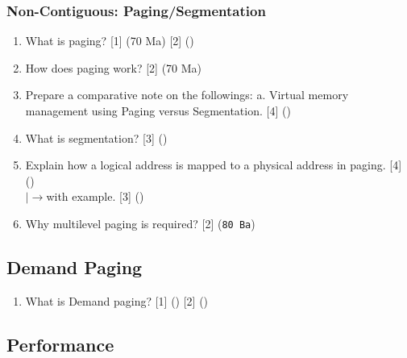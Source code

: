 \documentclass[12pt]{article}
\newcommand{\lb}{\\$\left|\rightarrow\right.$}
\begin{document}
		\subsubsection{Non-Contiguous: Paging/Segmentation}
			\begin{enumerate}[noitemsep, topsep=0pt]
				\item What is paging? \hfill [1] (70 Ma) [2] ()

				\item How does paging work? \hfill [2] (70 Ma)

				\item Prepare a comparative note on the followings: a. Virtual memory management using Paging versus Segmentation. \hfill [4] ()

				\item What is segmentation? \hfill [3] ()
				
				\item Explain how a logical address is mapped to a physical address in paging. \hfill [4] ()
				\lb with example. \hfill [3] ()

				\item Why multilevel paging is required? \hfill [2] (\texttt{80 Ba})
			\end{enumerate}

	\subsection{Demand Paging}
		\begin{enumerate}[noitemsep, topsep=0pt]
			\item What is Demand paging? \hfill [1] () [2] ()
		\end{enumerate}
	\subsection{Performance}
\end{document}
